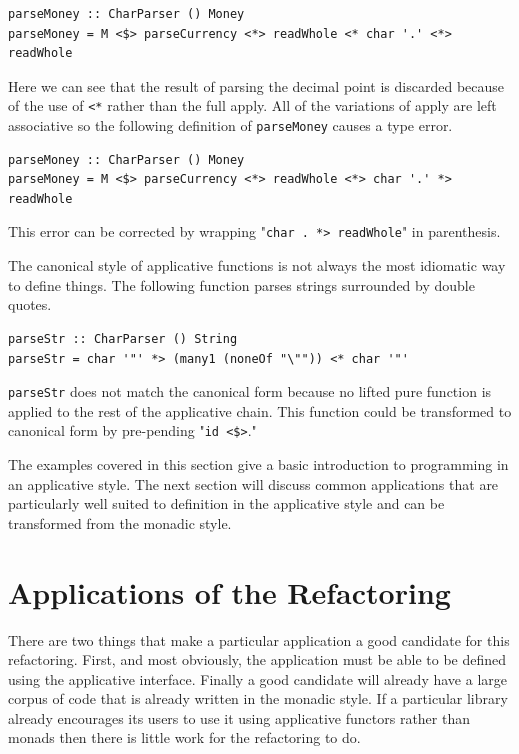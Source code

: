  \begin{lstlisting}[frame=tblr]
parseMoney :: CharParser () Money
parseMoney = M <$> parseCurrency <*> readWhole <* char '.' <*> readWhole
 \end{lstlisting}
 
 Here we can see that the result of parsing the decimal point is discarded because of the use of \texttt{<*} rather than the full apply. All of the variations of apply are left associative so the following definition of \texttt{parseMoney} causes a type error.
 
  \begin{lstlisting}[frame=tblr]
parseMoney :: CharParser () Money
parseMoney = M <$> parseCurrency <*> readWhole <*> char '.' *> readWhole
 \end{lstlisting}
 
This error can be corrected by wrapping "\texttt{char \textquotesingle.\textquotesingle~*> readWhole}" in parenthesis. 
 
The canonical style of applicative functions is not always the most idiomatic way to define things. The following function parses strings surrounded by double quotes.

\begin{lstlisting}[frame=tblr]
parseStr :: CharParser () String 
parseStr = char '"' *> (many1 (noneOf "\"")) <* char '"'
\end{lstlisting}

\texttt{parseStr} does not match the canonical form because no lifted pure function is applied to the rest of the applicative chain. This function could be transformed to canonical form by pre-pending "\texttt{id <\$>}."

The examples covered in this section give a basic introduction to programming in an applicative style. The next section will discuss common applications that are particularly well suited to definition in the applicative style and can be transformed from the monadic style. 

\section{Applications of the Refactoring}
\label{sec:appApps}

There are two things that make a particular application a good candidate for this refactoring. First, and most obviously, the application must be able to be defined using the applicative interface. Finally a good candidate will already have a large corpus of code that is already written in the monadic style. If a particular library already encourages its users to use it using applicative functors rather than monads then there is little work for the refactoring to do.

